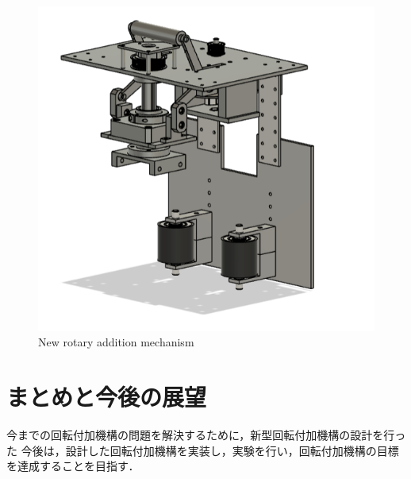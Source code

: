\documentclass{classes/sice-si}
\begin{document}
\begin{figure}[b]
    \centering
    \begin{minipage}{0.45\linewidth}
        \includegraphics[width=\linewidth]{figures/4.png}
        \caption{New rotary addition mechanism}
        \label{fig:new}
    \end{minipage}
    \hfill
    \vspace{0pt} %
\end{figure}



\section{まとめと今後の展望}
今までの回転付加機構の問題を解決するために，新型回転付加機構の設計を行った
今後は，設計した回転付加機構を実装し，実験を行い，回転付加機構の目標を達成することを目指す．



\printbibliography[title=参考文献]
\end{document}
